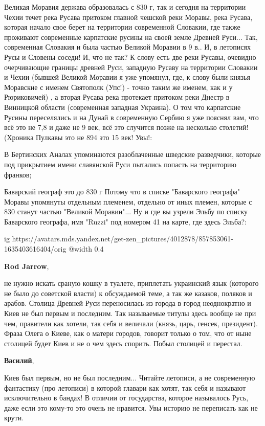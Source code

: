 \begin{itemize}
\begin{itemize}
Великая Моравия держава образовалась с 830 г, так и сегодня на территории Чехии
течет река Русава притоком главной чешской реки Моравы, река Русава, которая
начало свое берет на территории современной Словакии, где также проживают
современные карпатские русины на своей земле Древней Руси... Так, современная
Словакия и была частью Великой Моравии в 9 в.. И, в летописях Русы и Словены
соседи! И, что не так? К слову есть две реки Русавы, очевидно очерчивающие
границы древней Руси, западную Русаву на территории Словакии и Чехии (бывшей
Великой Моравии я уже упомянул, где, к слову были князья Моравские с именем
Святополк (Упс!) - точно таким же именем, как и у Рюриковичей) , а вторая
Русава река протекает притоком реки Днестр в Винницкой области (современная
западная Украина). О том что карпатские Русины переселялись и на Дунай в
современную Сербию я уже пояснял вам, что всё это не 7,8 и даже не 9 век, всё
это случится позже на несколько столетий! (Хроника Пулкавы это не 894 это 15
век! Увы!:

В Бертинских Аналах упоминаются разоблаченные шведские разведчики, которые под
прикрытием имени славянской Руси пытались попасть на территорию франков;

Баварский географ это до 830 г Потому что в списке "Баварского географа" Моравы
упомянуты отдельным племенем, отдельно от иных племен, которые с 830 станут
частью "Великой Моравии"... Ну и где вы узрели Эльбу по списку Баварского
географа, имя "Ruzzi" под номером 41 на карте, где здесь Эльба?:

\ifcmt
  ig https://avatars.mds.yandex.net/get-zen_pictures/4012878/857853061-1635403616404/orig
  @width 0.4
\fi

\textbf{Rod Jarrow}, 

не нужно искать сраную кошку в туалете, приплетать украинский язык (которого не
было до советской власти) к обсуждаемой теме, а так же казаков, поляков и
арабов. Столица Древней Руси переносилась из города в город неоднократно и Киев
не был первым и последним. Так называемые титулы здесь вообще не при чем,
правители как хотели, так себя и величали (князь, царь, генсек, президент).
Фраза Олега о Киеве, как о матери городов, говорит только о том, что от ныне
столицей будет Киев и не о чем здесь спорить. Побыл столицей и перестал.

\textbf{Василий}, 

Киев был первым, но не был последним... Читайте летописи, а не современную
фантастику (про летописи) в которой главари как хотят, так себя и называют
исключительно в бандах! В отличии от государства, которое называлось Русь, даже
если это кому-то это очень не нравится. Увы историю не переписать как не крути.


\end{itemize}
\end{itemize}
